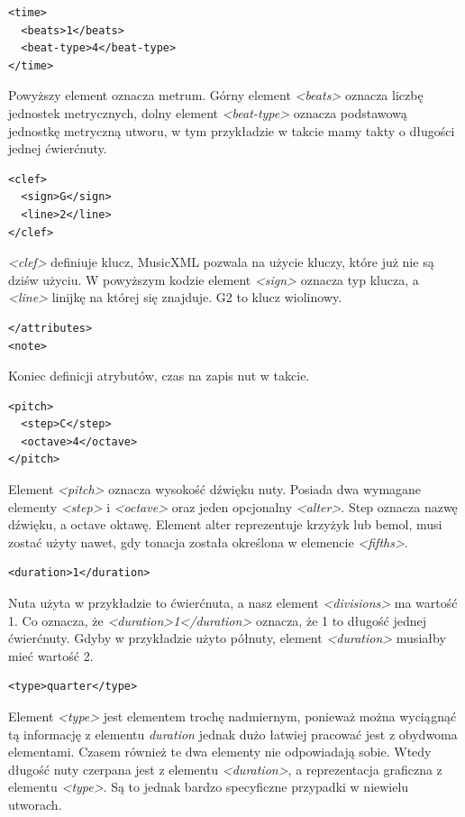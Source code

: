 \documentclass[printmode, eng]{mgr}
\begin{document}
\begin{lstlisting}
<time>
  <beats>1</beats>
  <beat-type>4</beat-type>
</time>
\end{lstlisting}
Powyższy element oznacza metrum. Górny element \textit{<beats>} oznacza liczbę jednostek metrycznych, dolny element \textit{<beat-type>} oznacza podstawową jednostkę metryczną utworu, w tym przykładzie w takcie mamy takty o długości jednej ćwierćnuty.

\begin{lstlisting}
<clef>
  <sign>G</sign>
  <line>2</line>
</clef>
\end{lstlisting}
\textit{<clef>} definiuje klucz, MusicXML pozwala na użycie kluczy, które już nie są dziś\linebreak w użyciu. W powyższym kodzie element \textit{<sign>} oznacza typ klucza, a \textit{<line>} linijkę na której się znajduje. G2 to klucz wiolinowy.

\begin{lstlisting}
</attributes>
<note>
\end{lstlisting}
Koniec definicji atrybutów, czas na zapis nut w takcie.

\begin{lstlisting}
<pitch>
  <step>C</step>
  <octave>4</octave>
</pitch>
\end{lstlisting}
Element \textit{<pitch>} oznacza wysokość dźwięku nuty. Posiada dwa wymagane elementy \textit{<step>} i \textit{<octave>} oraz jeden opcjonalny \textit{<alter>}. Step oznacza nazwę dźwięku, a octave oktawę. Element alter reprezentuje krzyżyk lub bemol, musi zostać użyty nawet, gdy  tonacja została określona w elemencie \textit{<fifths>}.

\begin{lstlisting}
<duration>1</duration>
\end{lstlisting}
Nuta użyta w przykładzie to ćwierćnuta, a nasz element \textit{<divisions>} ma wartość 1. Co oznacza, że \textit{<duration>1</duration>} oznacza, że 1 to długość jednej ćwierćnuty. Gdyby w przykładzie użyto półnuty, element \textit{<duration>} musiałby mieć wartość 2.

\begin{lstlisting}
<type>quarter</type>
\end{lstlisting}
Element \textit{<type>} jest elementem trochę nadmiernym, ponieważ można wyciągnąć tą informację z elementu \textit{duration} jednak dużo łatwiej pracować jest z obydwoma elementami. Czasem również te dwa elementy nie odpowiadają sobie. Wtedy długość nuty czerpana jest z elementu \textit{<duration>}, a reprezentacja graficzna z elementu \textit{<type>}. Są to jednak bardzo specyficzne przypadki w niewielu utworach.
\end{document}
